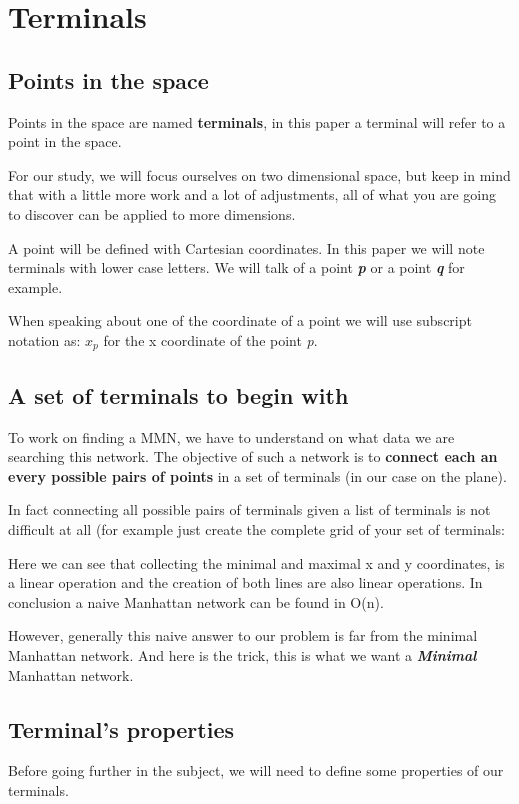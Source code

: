 \chapter{Terminals}
\section{Points in the space}
Points in the space are named \textbf{terminals}, in this paper a terminal will refer to a point in the space.\newline

For our study, we will focus ourselves on two dimensional space, but keep in mind that with a little more work and a lot of adjustments, all of what you are going to discover can be applied to more dimensions.

A point will be defined with Cartesian coordinates. In this paper we will note terminals with lower case letters. We will talk of a point \textbf{\emph{p}} or a point \textbf{\emph{q}} for example.

When speaking about one of the coordinate of a point we will use subscript notation as: $x_p$ for the x coordinate of the point \emph{p}.
\section{A set of terminals to begin with}%
To work on finding a MMN, we have to understand on what data we are searching this network. The objective of such a network is to \textbf{connect each an every possible pairs of points} in a set of terminals (in our case on the plane).

In fact connecting all possible pairs of terminals given a list of terminals is not difficult at all (for example just create the complete grid of your set of terminals: 



Here we can see that collecting the minimal and maximal x and y coordinates, is a linear operation and the creation of both lines are also linear operations. In conclusion a naive Manhattan network can be found in O(n). 

However, generally this naive answer to our problem is far from the minimal Manhattan network. And here is the trick, this is what we want a \textbf{\emph{Minimal}} Manhattan network.

\section{Terminal's properties}
Before going further in the subject, we will need to define some properties of our terminals.

